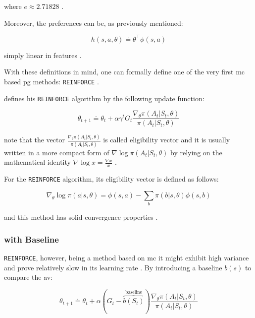 where $e \approx 2.71828$ \citep[p. 266]{Sutton2017}.

Moreover, the preferences can be, as previously mentioned:

\begin{equation}
\label{eq:dot_preferences}
	h(s,a,\theta) \doteq \theta^\top \phi (s,a)
\end{equation}

simply linear in features \citep[p. 266]{Sutton2017}.

With these definitions in mind, one can formally define one of the very first \gls{mc} based \gls{pg} methods: \texttt{REINFORCE} \citep{Williams1992}.

\citet{Williams1992} defines his \texttt{REINFORCE} algorithm by the following update function:

\begin{equation}
	\theta_{t+1} \doteq \theta_t + \alpha \gamma^t G_t \frac{\nabla_\theta \pi(A_t|S_t,\theta)}{\pi(A_t|S_t,\theta)}
\end{equation}

note that the vector $\frac{\nabla_\theta \pi(A_t|S_t,\theta)}{\pi(A_t|S_t,\theta)}$ is called eligibility vector and it is usually written in a more compact form of $\nabla \log \pi(A_t|S_t,\theta)$ by relying on the mathematical identity $\nabla \log x = \frac{\nabla x}{x}$ \citep[p. 271]{Sutton2017}.

For the \texttt{REINFORCE} algorithm, its eligibility vector is defined as follows:

\begin{equation}
	\nabla_\theta \log \pi (a|s,\theta) = \phi (s,a) - \sum_b \pi (b|s,\theta) \phi (s,b)
\end{equation}

and this method has solid convergence properties \citep[p. 271]{Sutton2017}.

\subsubsection{ with Baseline}

\texttt{REINFORCE}, however, being a method based on \gls{mc} it might exhibit high variance and prove relatively slow in its learning rate \citep[p. 271]{Sutton2017}. By introducing a baseline $b(s)$ to compare the \gls{av}:

\begin{equation}
	\theta_{t+1} \doteq \theta_t + \alpha (G_t - \overbrace{b(S_t)}^{\text{baseline}}) \frac{\nabla_\theta \pi(A_t|S_t,\theta)}{\pi(A_t|S_t,\theta)}
\end{equation}

